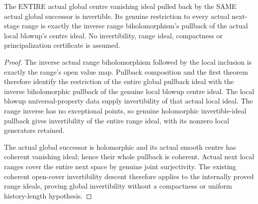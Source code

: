 \begin{theorem}
\label{hir:sharp-actual-curve-successor-centre-global-invertible}
\leanok
The ENTIRE actual global centre vanishing ideal pulled back by the SAME
actual global successor is invertible. Its genuine restriction to every
actual next-stage range is exactly the inverse range biholomorphism's
pullback of the actual local blowup's centre ideal. No invertibility,
range ideal, compactness or principalization certificate is assumed.
\end{theorem}
\begin{proof}
The inverse actual range biholomorphism followed by the local inclusion
is exactly the range's open value map. Pullback composition and the first
theorem therefore identify the restriction of the entire global pullback
ideal with the inverse biholomorphic pullback of the genuine local blowup
centre ideal. The local blowup universal-property data supply invertibility
of that actual local ideal. The range inverse has no exceptional points,
so genuine holomorphic invertible-ideal pullback gives invertibility of
the entire range ideal, with its nonzero local generators retained.

The actual global successor is holomorphic and its actual smooth centre
has coherent vanishing ideal; hence their whole pullback is coherent.
Actual next local ranges cover the entire next space by genuine joint
surjectivity. The existing coherent open-cover invertibility descent
therefore applies to the internally proved range ideals, proving global
invertibility without a compactness or uniform history-length hypothesis.
\end{proof}

